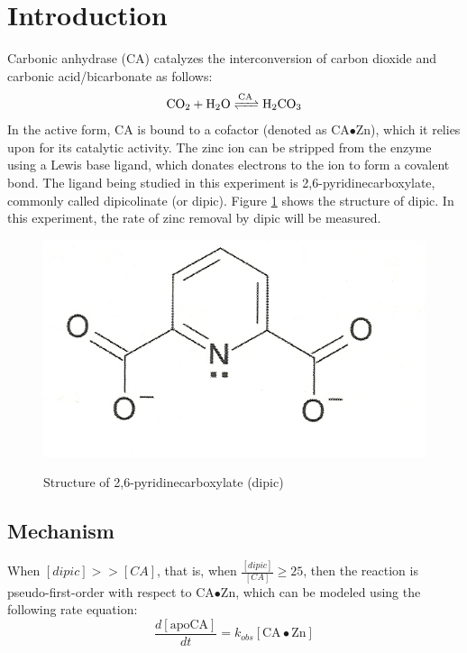 \section{Introduction}
Carbonic anhydrase (CA) catalyzes the interconversion of carbon dioxide and carbonic acid/bicarbonate as follows:
\begin{align}\label{eqn:ca_reaction}
\ce{CO_2 + H_2O 
<=>[\ce{CA}] 
H_2CO_3}
\end{align}
In the active form, CA is bound to a  cofactor (denoted as CA$\bullet$Zn), which it relies upon for its catalytic activity. The zinc ion can be stripped from the enzyme using a Lewis base ligand, which donates electrons to the ion to form a covalent bond. The ligand being studied in this experiment is 2,6-pyridinecarboxylate, commonly called dipicolinate (or dipic). Figure \ref{fig:dipic} shows the structure of dipic. In this experiment, the rate of zinc removal by dipic will be measured.
\begin{figure}[h]
  \includegraphics[scale=0.5]{./Figures/dipic.jpg}\\
  \caption{Structure of 2,6-pyridinecarboxylate (dipic)\cite{bib:lab_manual}}\label{fig:dipic}
\end{figure}
 
\subsection{Mechanism}
When $[dipic] >> [CA]$, that is, when $\frac{[dipic]}{[CA]} \ge 25$, then the reaction is pseudo-first-order with respect to CA$\bullet$Zn, which can be modeled using the following rate equation:
\begin{equation}\label{eqn:a}
\frac{d[\text{apoCA}]}{dt}=k_{obs}[\text{CA$\bullet$Zn}]
\end{equation}
